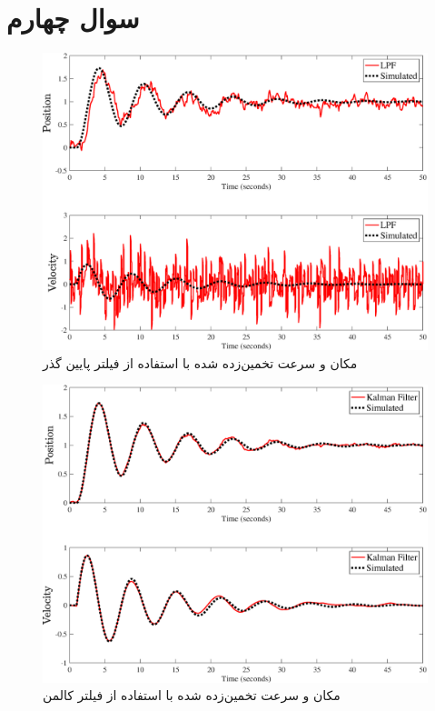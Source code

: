 \section{سوال چهارم}


 \begin{figure}[h]
	\centering
	\includegraphics[width=\linewidth]{../Figure/Q4/LPF}
	
	\caption{مکان و سرعت تخمین‌زده شده با استفاده از فیلتر پایین گذر}
\end{figure}

 \begin{figure}[h]
	\centering
	\includegraphics[width=\linewidth]{../Figure/Q4/Kalman}
	
	\caption{مکان و سرعت تخمین‌زده شده با استفاده از فیلتر کالمن}
\end{figure}